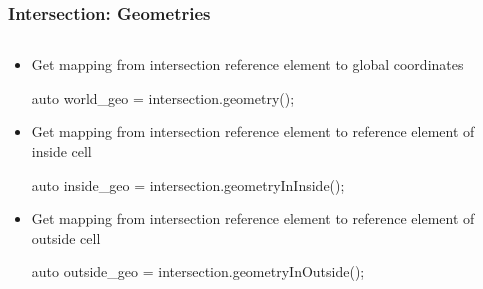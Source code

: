 \documentclass[aspectratio=169,11pt]{beamer}
\theoremstyle{definition}
\begin{document}
\begin{frame}[fragile] \frametitle{Intersection: Geometries}
  \begin{columns}
    \begin{column}{0.75\linewidth}
      \begin{itemize}
      \item Get mapping from intersection reference element to global coordinates
        \begin{cppcode}
auto world_geo =
    intersection.geometry();
        \end{cppcode}
      \item Get mapping from intersection reference element to reference element of inside cell
        \begin{cppcode}
auto inside_geo =
    intersection.geometryInInside();
        \end{cppcode}
      \item Get mapping from intersection reference element to reference element of outside cell
        \begin{cppcode}
auto outside_geo =
    intersection.geometryInOutside();
        \end{cppcode}
      \end{itemize}
    \end{column}
 \begin{column}{0.25\linewidth}
      \begin{center}
        \intersections{}
      \end{center}
    \end{column}
  \end{columns}

\end{frame}
\end{document}
